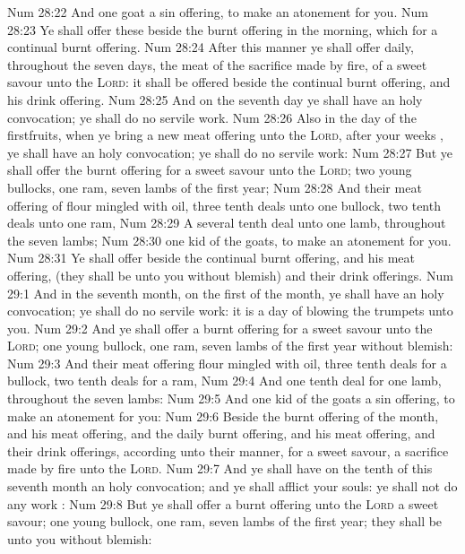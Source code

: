 \vs Num 28:22 And one goat  a sin offering, to make an atonement for you.
\vs Num 28:23 Ye shall offer these beside the burnt offering in the morning, which  for a continual burnt offering.
\vs Num 28:24 After this manner ye shall offer daily, throughout the seven days, the meat of the sacrifice made by fire, of a sweet savour unto the \textsc{Lord}: it shall be offered beside the continual burnt offering, and his drink offering.
\vs Num 28:25 And on the seventh day ye shall have an holy convocation; ye shall do no servile work.
\vs Num 28:26 Also in the day of the firstfruits, when ye bring a new meat offering unto the \textsc{Lord}, after your weeks , ye shall have an holy convocation; ye shall do no servile work:
\vs Num 28:27 But ye shall offer the burnt offering for a sweet savour unto the \textsc{Lord}; two young bullocks, one ram, seven lambs of the first year;
\vs Num 28:28 And their meat offering of flour mingled with oil, three tenth deals unto one bullock, two tenth deals unto one ram,
\vs Num 28:29 A several tenth deal unto one lamb, throughout the seven lambs;
\vs Num 28:30  one kid of the goats, to make an atonement for you.
\vs Num 28:31 Ye shall offer  beside the continual burnt offering, and his meat offering, (they shall be unto you without blemish) and their drink offerings.
\vs Num 29:1 And in the seventh month, on the first  of the month, ye shall have an holy convocation; ye shall do no servile work: it is a day of blowing the trumpets unto you.
\vs Num 29:2 And ye shall offer a burnt offering for a sweet savour unto the \textsc{Lord}; one young bullock, one ram,  seven lambs of the first year without blemish:
\vs Num 29:3 And their meat offering  flour mingled with oil, three tenth deals for a bullock,  two tenth deals for a ram,
\vs Num 29:4 And one tenth deal for one lamb, throughout the seven lambs:
\vs Num 29:5 And one kid of the goats  a sin offering, to make an atonement for you:
\vs Num 29:6 Beside the burnt offering of the month, and his meat offering, and the daily burnt offering, and his meat offering, and their drink offerings, according unto their manner, for a sweet savour, a sacrifice made by fire unto the \textsc{Lord}.
\vs Num 29:7 And ye shall have on the tenth  of this seventh month an holy convocation; and ye shall afflict your souls: ye shall not do any work :
\vs Num 29:8 But ye shall offer a burnt offering unto the \textsc{Lord}  a sweet savour; one young bullock, one ram,  seven lambs of the first year; they shall be unto you without blemish:
